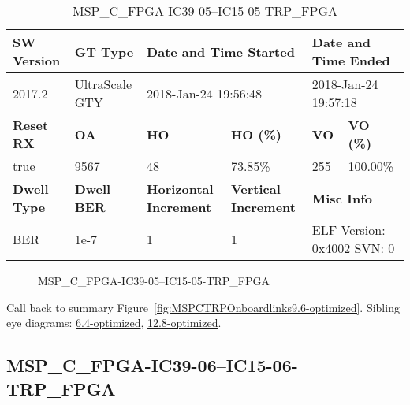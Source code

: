 \begin{table}[h]
\centering
\caption{MSP\_C\_FPGA-IC39-05--IC15-05-TRP\_FPGA}
\label{tab:MSPCFPGAIC3905IC1505TRPFPGA9.6-optimized}
\begin{tabular}{@{}|l|l|l|l|l|l|@{}}
\toprule
\textbf{SW Version}                & \textbf{GT Type}   & \multicolumn{2}{l|}{\textbf{Date and Time Started}}            & \multicolumn{2}{l|}{\textbf{Date and Time Ended}}        \\ \midrule
2017.2                       & UltraScale GTY          & \multicolumn{2}{l|}{2018-Jan-24 19:56:48}                   & \multicolumn{2}{l|}{2018-Jan-24 19:57:18}               \\ \midrule
\textbf{Reset RX}                  & \textbf{OA} & \textbf{HO}   & \textbf{HO (\%)} & \textbf{VO} & \textbf{VO (\%)} \\ \midrule
true & 9567        & 48          & 73.85\%        & 255        & 100.00\%       \\ \midrule
\textbf{Dwell Type}                & \textbf{Dwell BER} & \textbf{Horizontal Increment} & \textbf{Vertical Increment}    & \multicolumn{2}{l|}{\textbf{Misc Info}}                  \\ \midrule
BER                            & 1e-7        & 1        & 1           & \multicolumn{2}{l|}{ELF Version: 0x4002 SVN: 0}                         \\ \bottomrule
\end{tabular}
\end{table}

\begin{figure}[h]
\caption{MSP\_C\_FPGA-IC39-05--IC15-05-TRP\_FPGA} \label{fig:MSPCFPGAIC3905IC1505TRPFPGA9.6-optimized}
\end{figure}

Call back to summary Figure~\ref{fig:MSPCTRPOnboardlinks9.6-optimized}.
Sibling eye diagrams: \hyperref[sec:MSPCFPGAIC3905IC1505TRPFPGA6.4-optimized]{6.4-optimized}, \hyperref[sec:MSPCFPGAIC3905IC1505TRPFPGA12.8-optimized]{12.8-optimized}.

\clearpage
\newpage


\subsection{MSP\_C\_FPGA-IC39-06--IC15-06-TRP\_FPGA}\label{sec:MSPCFPGAIC3906IC1506TRPFPGA9.6-optimized}

